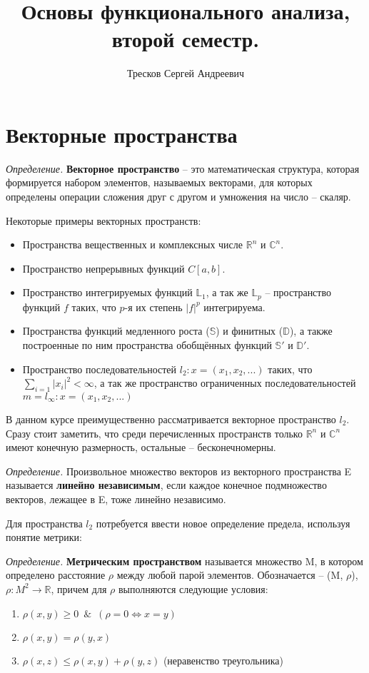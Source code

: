 \documentclass[12pt]{article}
\newcommand{\equals}{\Leftrightarrow}
\newcommand{\defi}{{\itshape Определение. }}
\renewcommand{\leq}{\leqslant}
\renewcommand{\geq}{\geqslant}
\begin{document}
	\title{Основы функционального анализа, второй семестр.}
	\author{Тресков Сергей Андреевич}
	\maketitle
	
	\section{Векторные пространства}
	
	\defi \textbf{Векторное пространство} -- это математическая структура, которая формируется набором элементов, называемых векторами, для которых определены операции сложения друг с другом и умножения на число -- скаляр.

	Некоторые примеры векторных пространств:
		\begin{itemize}
			\item Пространства вещественных и комплексных числе $\mathbb{R}^n$ и $\mathbb{C}^n$.
			\item Пространство непрерывных функций $C[a,b]$.
			\item Пространство интегрируемых функций $\mathbb{L}_1$, а так же $\mathbb{L}_p$ -- пространство функций $f$ таких, что $p$-я их степень $|f|^p$ интегрируема.
			\item Пространства функций медленного роста ($\mathbb{S}$) и финитных ($\mathbb{D}$), а также построенные по ним пространства обобщённых функций $\mathbb{S}'$ и $\mathbb{D}'$.
			\item Пространство последовательностей $l_2 : x = (x_1, x_2, ...)$ таких, что $\sum_{i=1} |x_i|^2 < \infty$, а так же пространство ограниченных последовательностей $m = l_\infty : x = (x_1, x_2, ...)$
		\end{itemize}

	В данном курсе преимущественно рассматривается векторное пространство $l_2$. Сразу стоит заметить, что среди перечисленных пространств только $\mathbb{R}^n$ и $\mathbb{C}^n$ имеют конечную размерность, остальные -- бесконечномерны.
	
	\defi Произвольное множество векторов из векторного пространства E называется \textbf{линейно независимым}, если каждое конечное
	подмножество векторов, лежащее в E, тоже линейно независимо.
	
	Для пространства $l_2$ потребуется ввести новое определение предела, используя понятие метрики:
	
	\defi \textbf{Метрическим пространством} называется множество M, в котором определено расстояние $\rho$ между любой парой элементов. Обозначается -- (M, $\rho$), $\rho : M^2 \rightarrow 
	\mathbb{R}$, причем для $\rho$ выполняются следующие условия:
	\begin{enumerate}
		\item $\rho(x,y) \geq 0$~$\&$~$(\rho = 0 \equals x=y)$
		\item $\rho(x,y) = \rho(y,x)$
		\item $\rho(x,z) \leq \rho(x,y) + \rho(y,z)$ (неравенство треугольника)
	\end{enumerate}
	
\end{document}
